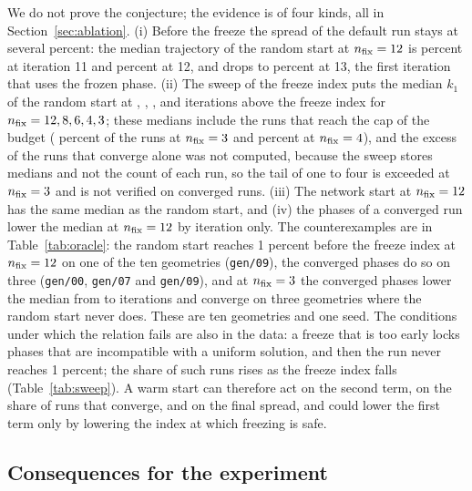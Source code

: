 We do not prove the conjecture; the evidence is of four kinds, all in Section~\ref{sec:ablation}. (i) Before the freeze the spread of the default run stays at several percent: the median trajectory of the random start at $n_{\mathrm{fix}}=12$ is \trRTwelveEleven{} percent at iteration 11 and \trRTwelveTwelve{} percent at 12, and drops to \trRTwelveThirteen{} percent at 13, the first iteration that uses the frozen phase. (ii) The sweep of the freeze index
puts the median $k_1$ of the random start at \swTwelveEx, \swEightEx, \swSixEx, \swFourEx{} and \swThreeEx{} iterations above the freeze index for $n_{\mathrm{fix}}=12,8,6,4,3$; these medians include the runs that reach the cap of the budget (\swThreeNever{} percent of the runs at $n_{\mathrm{fix}}=3$ and \swFourNever{} percent at $n_{\mathrm{fix}}=4$), and the excess of the runs that converge alone was not computed, because the sweep stores medians and not the count of each run, so the tail of one to four is exceeded at $n_{\mathrm{fix}}=3$ and is not verified on converged runs. (iii) The network start at $n_{\mathrm{fix}}=12$ has the same median as the random start, and (iv) the phases of a converged run lower the median at $n_{\mathrm{fix}}=12$ by \OTwelveGain{} iteration only. The counterexamples are in Table~\ref{tab:oracle}: the random start reaches 1 percent before the freeze index at $n_{\mathrm{fix}}=12$ on one of the ten geometries (\texttt{gen/09}), the converged phases do so on three (\texttt{gen/00}, \texttt{gen/07} and \texttt{gen/09}), and at $n_{\mathrm{fix}}=3$ the converged phases lower the median from \ORThreeMed{} to \OThreeMed{} iterations and converge on three geometries where the random start never does. These are ten geometries and one seed. The conditions under which the relation fails are also in the data: a freeze that is too early locks phases that are
incompatible with a uniform solution, and then the run never reaches 1 percent; the share of such runs rises as the freeze index falls (Table~\ref{tab:sweep}). A warm start can therefore act on the second term, on the share of runs that converge, and on the final spread, and could lower the first term only by lowering the index at which freezing is safe.

\subsection{Consequences for the experiment}\label{sec:consequences}

